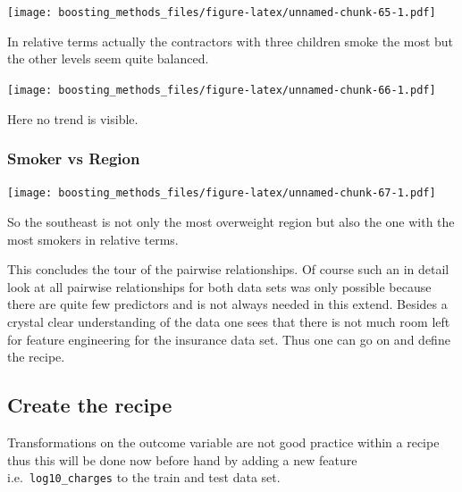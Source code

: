 \documentclass[
]{book}
\newenvironment{Shaded}{\begin{snugshade}}{\end{snugshade}}
\newcommand{\CommentTok}[1]{\textcolor[rgb]{0.56,0.35,0.01}{\textit{#1}}}
\newcommand{\FunctionTok}[1]{\textcolor[rgb]{0.00,0.00,0.00}{#1}}
\newcommand{\NormalTok}[1]{#1}
\newcommand{\OtherTok}[1]{\textcolor[rgb]{0.56,0.35,0.01}{#1}}
\newcommand{\SpecialCharTok}[1]{\textcolor[rgb]{0.00,0.00,0.00}{#1}}
\begin{document}
\texttt{[image: boosting\_methods\_files/figure-latex/unnamed-chunk-65-1.pdf]}

In relative terms actually the contractors with three children smoke the most but the other levels seem quite balanced.

\texttt{[image: boosting\_methods\_files/figure-latex/unnamed-chunk-66-1.pdf]}

Here no trend is visible.

\hypertarget{smoker-vs-region}{%
\subsubsection{Smoker vs Region}\label{smoker-vs-region}}

\texttt{[image: boosting\_methods\_files/figure-latex/unnamed-chunk-67-1.pdf]}

So the southeast is not only the most overweight region but also the one with the most smokers in relative terms.

This concludes the tour of the pairwise relationships. Of course such an in detail look at all pairwise relationships for both data sets was only possible because there are quite few predictors and is not always needed in this extend. Besides a crystal clear understanding of the data one sees that there is not much room left for feature engineering for the insurance data set. Thus one can go on and define the recipe.

\hypertarget{create-the-recipe-1}{%
\subsection{Create the recipe}\label{create-the-recipe-1}}

Transformations on the outcome variable are not good practice within a recipe thus this will be done now before hand by adding a new feature i.e.~\texttt{log10\_charges} to the train and test data set.

\begin{Shaded}
\end{Shaded}
\end{document}
